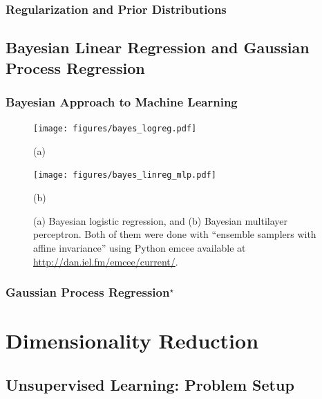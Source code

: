 \documentclass{report}
\begin{document}
\subsection{Regularization and Prior Distributions}


\section{Bayesian Linear Regression and Gaussian Process Regression}

\subsection{Bayesian Approach to Machine Learning}

\begin{figure}[t]
    \centering
    \begin{minipage}{0.48\textwidth}
        \centering
        \texttt{[image: figures/bayes\_logreg.pdf]}

        (a)
    \end{minipage}
    \hfill
    \begin{minipage}{0.48\textwidth}
        \centering
        \texttt{[image: figures/bayes\_linreg\_mlp.pdf]}

        (b)
    \end{minipage}

    \caption{
        \label{fig:bayes_logreg}
        (a) Bayesian logistic regression, and (b) Bayesian multilayer
        perceptron. Both of them were done with ``ensemble samplers with affine
        invariance'' \cite{goodman2010ensemble} using Python emcee available at
        \url{http://dan.iel.fm/emcee/current/}. 
    }
\end{figure}


\subsection{Gaussian Process Regression$^\star$}


\chapter{Dimensionality Reduction}
\label{chap:dimred}

\section{Unsupervised Learning: Problem Setup}
\end{document}
